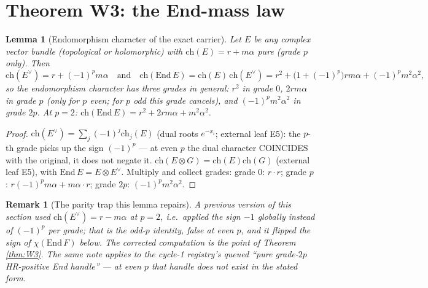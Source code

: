 \documentclass[11pt]{article}
\newtheorem{lemma}{Lemma}
\newtheorem{remark}{Remark}
\begin{document}
\section{Theorem W3: the End-mass law}\label{sec:endsignature}

\begin{lemma}[Endomorphism character of the exact carrier]\label{lem:endchar}
Let $E$ be any complex vector bundle (topological or holomorphic) with
$\mathrm{ch}(E)=r+m\alpha$ pure (grade $p$ only). Then
\[
\mathrm{ch}(E^\vee)=r+(-1)^p m\alpha \quad\text{and}\quad
\mathrm{ch}(\mathrm{End}\,E)=\mathrm{ch}(E)\,\mathrm{ch}(E^\vee)
= r^{2}+\bigl(1+(-1)^p\bigr)rm\alpha+(-1)^p m^{2}\alpha^{2},
\]
so the endomorphism character has three grades in general: $r^2$ in grade $0$, $2rm\alpha$ in grade $p$
(\emph{only for $p$ even}; for $p$ odd this grade cancels), and $(-1)^p m^2\alpha^2$ in grade $2p$. At $p=2$:
$\mathrm{ch}(\mathrm{End}\,E)=r^{2}+2rm\alpha+m^{2}\alpha^{2}$.
\end{lemma}

\begin{proof}
$\mathrm{ch}(E^\vee)=\sum_j(-1)^{j}\mathrm{ch}_j(E)$ (dual roots $e^{-x_i}$; external leaf E5): the $p$-th grade
picks up the sign $(-1)^p$ --- at even $p$ the dual character COINCIDES with the original, it does not negate it.
$\mathrm{ch}(E\otimes G)=\mathrm{ch}(E)\mathrm{ch}(G)$ (external leaf E5), with $\mathrm{End}\,E=E\otimes E^\vee$.
Multiply and collect grades: grade $0$: $r\cdot r$; grade $p$: $r(-1)^pm\alpha+m\alpha\cdot r$; grade $2p$:
$(-1)^pm^2\alpha^2$.
\end{proof}

\begin{remark}[The parity trap this lemma repairs]
A previous version of this section used $\mathrm{ch}(E^\vee)=r-m\alpha$ at $p=2$, i.e.\ applied the sign $-1$
globally instead of $(-1)^p$ per grade; that is the odd-$p$ identity, false at even $p$, and it flipped the sign of
$\chi(\mathrm{End}\,F)$ below. The corrected computation is the point of Theorem \ref{thm:W3}. The same note applies
to the cycle-1 registry's queued ``pure grade-$2p$ HR-positive End handle'' --- at even $p$ that handle does not
exist in the stated form.
\end{remark}
\end{document}
